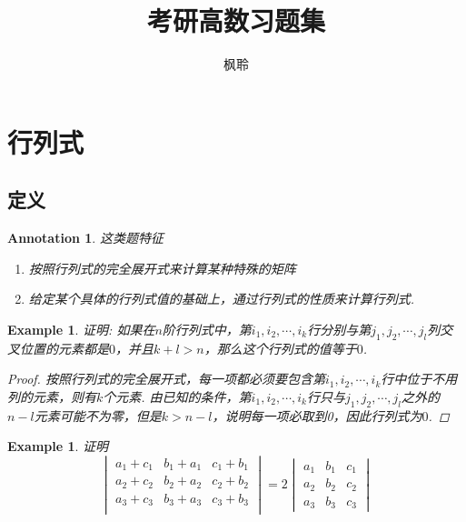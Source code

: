 \documentclass{article}
\newtheorem{example}[theorem]{Example}
\newtheorem{annotation}[theorem]{Annotation}
\begin{document}
\title{考研高数习题集}
\author{枫聆}
\maketitle
\tableofcontents

\newpage
\section{行列式}

\subsection{定义}

\begin{annotation}
\rm 这类题特征
\begin{enumerate}
	\item 按照行列式的完全展开式来计算某种特殊的矩阵
	\item 给定某个具体的行列式值的基础上，通过行列式的性质来计算行列式. 
\end{enumerate}
\end{annotation}

\begin{example}
\rm 证明: 如果在$n$阶行列式中，第$i_1,i_2,\cdots,i_k$行分别与第$j_1,j_2,\cdots,j_l$列交叉位置的元素都是$0$，并且$k+l > n$，那么这个行列式的值等于$0$.
\begin{proof}
按照行列式的完全展开式，每一项都必须要包含第$i_1,i_2,\cdots,i_k$行中位于不用列的元素，则有$k$个元素. 由已知的条件，第$i_1,i_2,\cdots,i_k$行只与$j_1,j_2,\cdots,j_l$之外的$n-l$元素可能不为零，但是$k > n-l$，说明每一项必取到0，因此行列式为$0$. 
\end{proof}
\end{example}

\begin{example}
\rm 证明
$$
\begin{vmatrix}
a_1 + c_1 &  b_1 + a_1 & c_1+b_1 \\
a_2 + c_2 &  b_2 + a_2 & c_2+b_2 \\
a_3 + c_3 &  b_3 + a_3 & c_3+b_3 \\
\end{vmatrix} = 2 \begin{vmatrix}
a_1 & b_1 & c_1 \\
a_2 & b_2 & c_2 \\
a_3 & b_3 & c_3 	
\end{vmatrix}
$$
\end{example}
\end{document}
